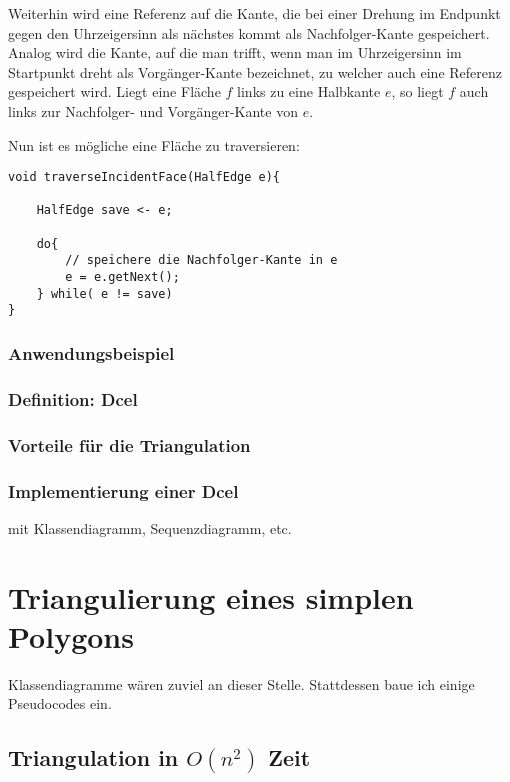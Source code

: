 \documentclass[a4paper]{article}
\begin{document}
Weiterhin wird eine Referenz auf die Kante, die bei einer Drehung im Endpunkt gegen den Uhrzeigersinn als nächstes kommt als Nachfolger-Kante gespeichert. Analog wird die Kante, auf die man trifft, wenn man im Uhrzeigersinn im Startpunkt dreht als Vorgänger-Kante bezeichnet, zu welcher auch eine Referenz gespeichert wird. Liegt eine Fläche $f$ links zu eine Halbkante $e$, so liegt $f$ auch links zur Nachfolger- und Vorgänger-Kante von $e$.

Nun ist es mögliche eine Fläche zu traversieren:

\begin{lstlisting}
void traverseIncidentFace(HalfEdge e){

	HalfEdge save <- e;
	
	do{
		// speichere die Nachfolger-Kante in e
		e = e.getNext();
	} while( e != save)
}
\end{lstlisting}







\subsubsection{Anwendungsbeispiel}
\subsubsection{Definition: Dcel}
\subsubsection{Vorteile für die Triangulation}
\subsubsection{Implementierung einer Dcel}
mit Klassendiagramm, Sequenzdiagramm, etc.



\section{Triangulierung eines simplen Polygons}
Klassendiagramme wären zuviel an dieser Stelle. Stattdessen baue ich einige Pseudocodes ein.

\subsection{Triangulation in $O(n^2)$ Zeit}
\end{document}
